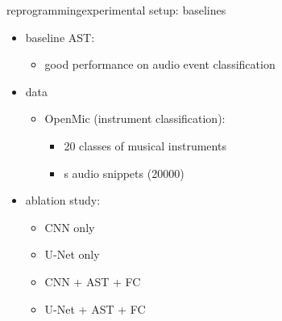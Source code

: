 \begin{frame}{reprogramming}{experimental setup: baselines}
    \vspace{-3mm}
    \begin{itemize}
        \item baseline AST:
            \begin{itemize}
                \item   good performance on audio event classification \cite{gong_ast_2021}
            \end{itemize}
        \bigskip
        \item data
            \begin{itemize}
                \item   OpenMic (instrument classification):
                    \begin{itemize}
                        \item   20 classes of musical instruments
                        \item   \unit[10]{s} audio snippets (20000)
                    \end{itemize}
            \end{itemize}
        \bigskip
        \item   ablation study:
            \begin{itemize}
                \item   CNN only
                \item   U-Net only
                \item   CNN + AST + FC
                \item   U-Net + AST + FC
            \end{itemize}
    \end{itemize}
\end{frame}

